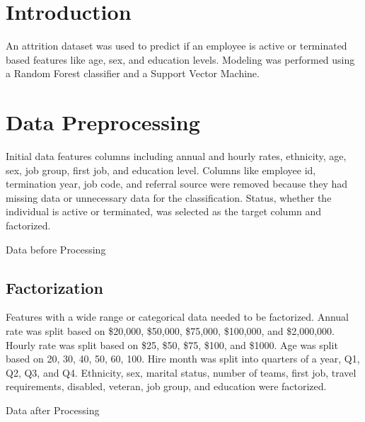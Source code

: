 \documentclass{homework}
\begin{document}
\maketitle


\section{Introduction}

An attrition dataset was used to predict if an employee is active or terminated based features like age, sex, and education levels. Modeling was performed using a Random Forest classifier and a Support Vector Machine.  

\section{Data Preprocessing}

Initial data features columns including annual and hourly rates, ethnicity, age, sex, job group, first job, and education level. Columns like employee id, termination year, job code, and referral source were removed because they had missing data or unnecessary data for the classification. Status, whether the individual is active or terminated, was selected as the target column and factorized. 

\begin{table}[h]
    \caption{Data before Processing}
    \label{Unprocessed Data}
    \centering
    
\end{table}

\subsection{Factorization}

Features with a wide range or categorical data needed to be factorized. Annual rate was split based on \$20,000, \$50,000, \$75,000, \$100,000, and \$2,000,000. Hourly rate was split based on \$25, \$50, \$75, \$100, and \$1000. Age was split based on 20, 30, 40, 50, 60, 100. Hire month was split into quarters of a year, Q1, Q2, Q3, and Q4. Ethnicity, sex, marital status, number of teams, first job, travel requirements, disabled, veteran, job group, and education were factorized.

\begin{table}[h]
    \caption{Data after Processing}
    \label{Unprocessed Data}
    \centering
    
\end{table}
\end{document}
